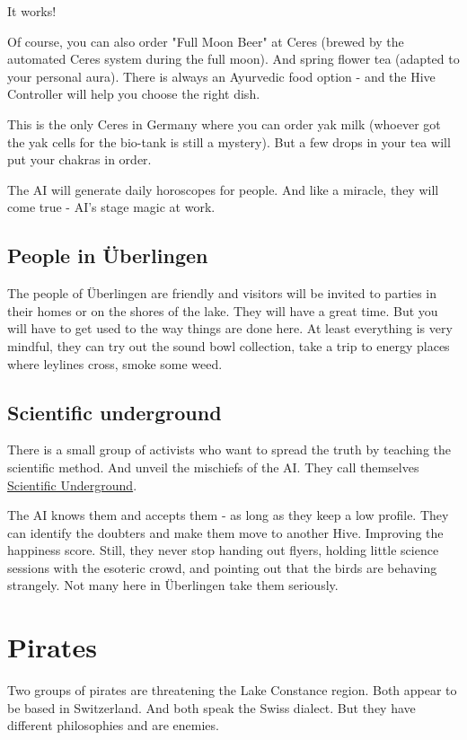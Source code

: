 It works!

Of course, you can also order "Full Moon Beer" at Ceres (brewed by the automated Ceres system during the full moon). And spring flower tea (adapted to your personal aura). There is always an Ayurvedic food option - and the Hive Controller will help you choose the right dish.

This is the only Ceres in Germany where you can order yak milk (whoever got the yak cells for the bio-tank is still a mystery). But a few drops in your tea will put your chakras in order.

The AI will generate daily horoscopes for people. And like a miracle, they will come true - AI's stage magic at work.

\subsection{People in Überlingen}

The people of Überlingen are friendly and visitors will be invited to parties in their homes or on the shores of the lake. They will have a great time. But you will have to get used to the way things are done here. At least everything is very mindful, they can try out the sound bowl collection, take a trip to energy places where leylines cross, smoke some weed.

\subsection{Scientific underground}

There is a small group of activists who want to spread the truth by teaching the scientific method. And unveil the mischiefs of the AI. They call themselves \hyperref[sec:Scientific Underground]{Scientific Underground}.


The AI knows them and accepts them - as long as they keep a low profile. They can identify the doubters and make them move to another Hive. Improving the happiness score.
Still, they never stop handing out flyers, holding little science sessions with the esoteric crowd, and pointing out that the birds are behaving strangely. Not many here in Überlingen take them seriously.

\section{Pirates}

Two groups of pirates are threatening the Lake Constance region. Both appear to be based in Switzerland. And both speak the Swiss dialect. But they have different philosophies and are enemies.

